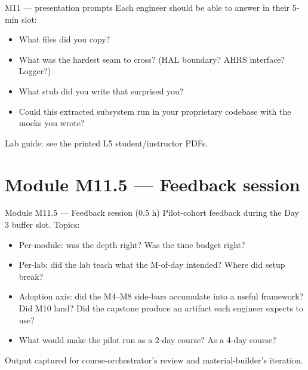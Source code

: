 \documentclass[aspectratio=169,11pt]{beamer}
\begin{document}
\begin{frame}[allowframebreaks]{M11 --- presentation prompts}
  Each engineer should be able to answer in their 5-min slot:
  \begin{itemize}
    \item What files did you copy?
    \item What was the hardest seam to cross? (HAL boundary? AHRS interface? Logger?)
    \item What stub did you write that surprised you?
    \item Could this extracted subsystem run in your proprietary codebase with the mocks you wrote?
  \end{itemize}
  \vfill
  Lab guide: see the printed L5 student/instructor PDFs.
\end{frame}

\section{Module M11.5 --- Feedback session}

\begin{frame}[allowframebreaks]{Module M11.5 --- Feedback session (0.5 h)}
  Pilot-cohort feedback during the Day 3 buffer slot.
  \vfill
  Topics:
  \begin{itemize}
    \item Per-module: was the depth right? Was the time budget right?
    \item Per-lab: did the lab teach what the M-of-day intended? Where did setup break?
    \item Adoption axis: did the M4--M8 side-bars accumulate into a useful framework? Did M10 land? Did the capstone produce an artifact each engineer expects to use?
    \item What would make the pilot run as a 2-day course? As a 4-day course?
  \end{itemize}
  \vfill
  Output captured for course-orchestrator's review and material-builder's iteration.
\end{frame}
\end{document}
